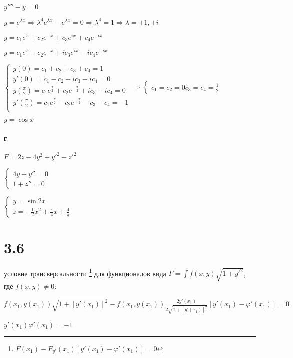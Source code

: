 \documentclass[russian]{article}
\begin{document}
$y'''' - y= 0$

$y=e^{\lambda x} \Rightarrow \lambda ^4 e^{\lambda x} - e^{
\lambda x} = 0 \Rightarrow \lambda^4 = 1 \Rightarrow 
\lambda = \pm 1, \pm i$

$y=c_1 e^x + c_2 e^{-x} + c_3 e^{i x} + c_4 e^{-i x}$

$y=c_1 e^x - c_2 e^{-x} + i c_3 e^{i x} - i c_4 e^{-i x}$

$\begin{cases}
y(0) = c_1 + c_2 + c_3 + c_4 = 1\\
y'(0) = c_1 - c_2 + i c_3 - i c_4 = 0\\
y(\frac{\pi}{2}) = c_1 e^\frac{\pi}{2} + c_2 e^{-\frac{\pi}{2}} + i c_3 - i c_4 = 0\\
y'(\frac{\pi}{2}) = c_1 e^\frac{\pi}{2} - c_2 e^{-\frac{\pi}{2}} - c_3 - c_4 = -1\\
\end{cases}
\Rightarrow
\begin{cases}
c_1 = c_2 = 0
c_3 = c_4 = \frac{1}{2}
\end{cases}$

$y= \cos x$

\paragraph*{г}

$ F = 2z - 4y^2 + y'^2 - z'^2 $

$\begin{cases}
4 y + y'' = 0 \\
1 + z'' = 0
\end{cases}$

$\begin{cases}
y = \sin 2x \\
z = -\frac{1}{2} x^2 + \frac{\pi}{4} x + \frac{4}{\pi}
\end{cases}$

\section*{3.6}

условие трансверсальности \footnote{
	$F(x_1)-F_{y'}(x_1)[y'(x_1)-\varphi'(x_1)] = 0$
}
для функционалов вида $F=\int f(x,y)\sqrt{1+y'^2}$, где $f(x,y) \ne 0$:

$f(x_1, y(x_1))\sqrt{1+[y'(x_1)]^2} - f(x_1, y(x_1)) \frac{2y'(x_1)}{2\sqrt{1 + [y'(x_1)]^2}}[y'(x_1) - \varphi'(x_1)] = 0$

$y'(x_1)\varphi'(x_1)=-1$
\end{document}
